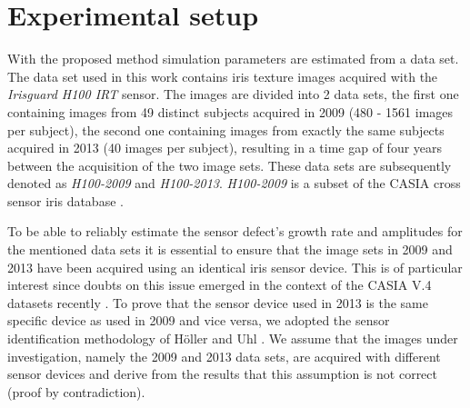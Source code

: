 \documentclass[10pt,twocolumn,letterpaper]{article}
\begin{document}

\section{Experimental setup}
 \label{testing}
 With the proposed method simulation parameters are estimated from a data set. The data set used in this work contains iris texture images acquired with the \emph{Irisguard H100 IRT} sensor. The images are divided into 2 data sets, the first one containing images from 49 distinct subjects acquired in 2009 (480 - 1561 images per subject), the second one containing images from exactly the same subjects acquired in 2013 (40 images per subject), resulting in a time gap of four years between the acquisition of the two image sets. These data sets are subsequently denoted as \emph{H100-2009} and \emph{H100-2013}. \emph{H100-2009} is a subset of the CASIA cross sensor iris database \cite{Xiao13a}.

To be able to reliably estimate the sensor defect's growth rate and amplitudes for the mentioned data sets it is essential to ensure that the image sets in 2009 and 2013 have been acquired using an identical iris sensor device. This is of particular interest since doubts on this issue emerged in the context of the CASIA V.4 datasets recently \cite{Debiasi14a}. 
To prove that the sensor device used in 2013 is the same specific device as used in 2009 and vice versa, we adopted the sensor identification methodology of H\"oller and Uhl \cite{UhlH12}. 
We assume that the images under investigation, namely the 2009 and 2013 data sets, are acquired with different sensor devices and derive from the results that this assumption is not correct (proof by contradiction).
\end{document}
